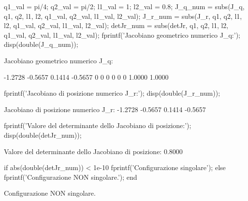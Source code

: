 \documentclass[11pt, a4paper]{article}
\begin{document}
\begin{matlabcode}
q1_val = pi/4;
q2_val = pi/2;
l1_val = 1;
l2_val = 0.8;
J_q_num = subs(J_q, {q1, q2, l1, l2}, {q1_val, q2_val, l1_val, l2_val});
J_r_num = subs(J_r, {q1, q2, l1, l2}, {q1_val, q2_val, l1_val, l2_val});
detJr_num = subs(detJr, {q1, q2, l1, l2}, {q1_val, q2_val, l1_val, l2_val});
fprintf('Jacobiano geometrico numerico J_q:');
disp(double(J_q_num));
\end{matlabcode}
\begin{matlaboutput}
Jacobiano geometrico numerico J_q:
\end{matlaboutput}
\begin{matlaboutput}
   -1.2728   -0.5657
    0.1414   -0.5657
         0         0
         0         0
         0         0
    1.0000    1.0000
\end{matlaboutput}
\begin{matlabcode}
fprintf('Jacobiano di posizione numerico J_r:');
disp(double(J_r_num));
\end{matlabcode}
\begin{matlaboutput}
Jacobiano di posizione numerico J_r:
   -1.2728   -0.5657
    0.1414   -0.5657
\end{matlaboutput}
\begin{matlabcode}
fprintf('Valore del determinante dello Jacobiano di posizione:');
disp(double(detJr_num));
\end{matlabcode}
\begin{matlaboutput}
Valore del determinante dello Jacobiano di posizione:
    0.8000
\end{matlaboutput}
\begin{matlabcode}
if abs(double(detJr_num)) < 1e-10
    fprintf('Configurazione singolare\n');
else
    fprintf('Configurazione NON singolare.\n');
end
\end{matlabcode}
\begin{matlaboutput}
Configurazione NON singolare.
\end{matlaboutput}
\end{document}
